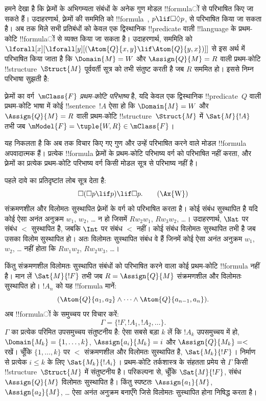 \documentclass[../../../include/open-logic-section]{subfiles}
\begin{document}


हमने देखा है कि फ़्रेमों के अभिगम्यता संबंधों के अनेक गुण मोडल !!{formula}ों
से परिभाषित किए जा सकते हैं। उदाहरणार्थ, फ़्रेमों की सममिति को
!!{formula}~, $p \lif \Box\Diamond p$, से परिभाषित किया जा सकता है।
अब तक मिले सभी प्रतिबंधों को केवल एक द्विस्थानिक !!{predicate} वाली !!{language} के
प्रथम-कोटि !!{formula}ों से व्यक्त किया जा सकता है। उदाहरणार्थ, सममिति को
$\lforall[x][\lforall[y][(\Atom{Q}{x,y} \lif \Atom{Q}{y, x})]]$ से इस अर्थ
में परिभाषित किया जाता है कि $\Domain{M} = W$ और $\Assign{Q}{M} = R$ वाली
प्रथम-कोटि !!{structure}~$\Struct{M}$ पूर्ववर्ती सूत्र को तभी संतुष्ट करती है
जब $R$ सममित हो। इससे निम्न परिभाषा सुझती है:

\begin{defn}
  फ़्रेमों का वर्ग~$\mClass{F}$ \emph{प्रथम-कोटि परिभाष्य} है, यदि केवल एक
  द्विस्थानिक !!{predicate}~$Q$ वाली प्रथम-कोटि भाषा में कोई !!{sentence}~$!A$ ऐसा
  हो कि $\Domain{M} = W$ और $\Assign{Q}{M} = R$ वाली प्रथम-कोटि
  !!{structure}~$\Struct{M}$ में $\Sat{M}{!A}$ तभी जब
  $\mModel{F} = \tuple{W, R} \in \mClass{F}$।
\end{defn}

यह निकलता है कि अब तक विचार किए गए गुण और उन्हें परिभाषित करने वाले मोडल
!!{formula} अपवादात्मक हैं। प्रत्येक !!{formula} फ़्रेमों के प्रथम-कोटि परिभाष्य
वर्ग को परिभाषित नहीं करता, और फ़्रेमों का प्रत्येक प्रथम-कोटि परिभाष्य वर्ग
किसी मोडल सूत्र से परिभाष्य नहीं है।

पहले दावे का प्रतिदृष्टांत लोब सूत्र देता है:
\begin{equation}
\Box(\Box p \lif p) \lif \Box p. \tag{\Ax{W}}
\end{equation}
 संक्रमणशील और विलोमतः सुस्थापित फ़्रेमों के वर्ग को परिभाषित करता
है। कोई संबंध सुस्थापित है यदि कोई ऐसा अनंत अनुक्रम $w_1$, $w_2$, \dots{}
न हो जिसमें $Rw_2w_1$, $Rw_3w_2$, \dots। उदाहरणार्थ, $\Nat$ पर संबंध
$<$ सुस्थापित है, जबकि $\Int$ पर संबंध $<$ नहीं। कोई संबंध विलोमतः
सुस्थापित तभी है जब उसका विलोम सुस्थापित हो। अतः विलोमतः सुस्थापित संबंध वे
हैं जिनमें कोई ऐसा अनंत अनुक्रम $w_1$, $w_2$, \dots{} नहीं होता कि
$Rw_1w_2$, $Rw_2w_3$, \dots।

किंतु संक्रमणशील विलोमतः सुस्थापित संबंधों को परिभाषित करने वाला कोई
प्रथम-कोटि !!{formula} नहीं है। मान लें $\Sat{M}{!F}$ तभी जब
$R = \Assign{Q}{M}$ संक्रमणशील और विलोमतः सुस्थापित हो। $!A_n$ को यह
!!{formula} मानें:
\[
(\Atom{Q}{a_1,a_2} \land \dots \land
    \Atom{Q}{a_{n-1},a_{n}}).
\]
अब !!{formula}ों के समुच्चय पर विचार करें:
\[
\Gamma = \{!F, !A_1, !A_2, \dots\}.
\]
$\Gamma$ का प्रत्येक परिमित उपसमुच्चय संतुष्टनीय है: ऐसा सबसे बड़ा $k$ लें
कि $!A_k$ उपसमुच्चय में हो, $\Domain{M_k} = \{1, \dots, k\}$,
$\Assign{a_i}{M_k} = i$ और $\Assign{Q}{M_k} = <$ रखें। चूँकि
$\{1,\dots,k\}$ पर $<$ संक्रमणशील और विलोमतः सुस्थापित है,
$\Sat{M_k}{!F}$। निर्माण से प्रत्येक $i \le k$ के लिए
$\Sat{M_k}{!A_i}$। प्रथम-कोटि तर्कशास्त्र के संहतता प्रमेय से $\Gamma$ किसी
!!{structure}~$\Struct{M}$ में संतुष्टनीय है। परिकल्पना से, चूँकि
$\Sat{M}{!F}$, संबंध $\Assign{Q}{M}$ विलोमतः सुस्थापित है। किंतु स्पष्टतः
$\Assign{a_1}{M}$, $\Assign{a_2}{M}$, \dots{} ऐसा अनंत अनुक्रम बनाएँगे जिसे
विलोमतः सुस्थापित होना निषिद्ध करता है।
\end{document}
